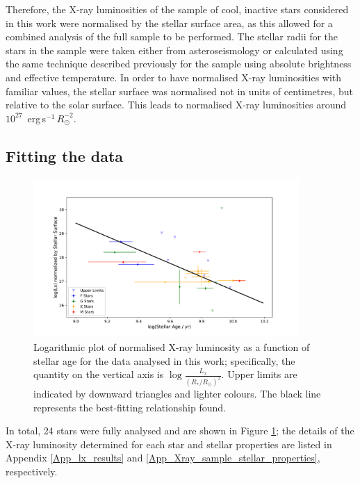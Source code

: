 Therefore, the X-ray luminosities of the sample of cool, inactive stars considered in this work were normalised by the stellar surface area, as this allowed for a combined analysis of the full sample to be performed. The stellar radii for the stars in the sample were taken either from asteroseismology or calculated using the same technique described previously for the \citet{Schmitt_Liefke_2004} sample using absolute brightness and effective temperature. In order to have normalised X-ray luminosities with familiar values, the stellar surface was normalised not in units of centimetres, but relative to the solar surface. This leads to normalised X-ray luminosities around $10^{27}$~erg\,s$^{-1}$\,$R_\odot^{-2}$.

\subsection{Fitting the data}

\begin{figure}[ht]
    \centering
    \includegraphics[width=0.9\textwidth]{Figures/3-Xray_age/xray_results_with_fit.pdf}
    \caption[Plot of normalised X-ray luminosity as a function of age]{Logarithmic plot of normalised X-ray luminosity as a function of stellar age for the data analysed in this work; specifically, the quantity on the vertical axis is $\log\frac{L_{x}}{(R_\ast/R_\odot)^{2}}$. Upper limits are indicated by downward triangles and lighter colours. The black line represents the best-fitting relationship found.}
    \label{fig:Xray_sample}
\end{figure}

In total, 24 stars were fully analysed and are shown in Figure \ref{fig:Xray_sample}; the details of the X-ray luminosity determined for each star and stellar properties are listed in Appendix \ref{App_lx_results} and \ref{App_Xray_sample_stellar_properties}, respectively.


